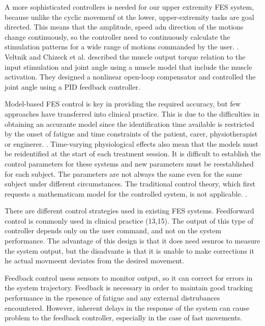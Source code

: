 
A more sophisticated controllers is needed for our upper extremity FES system, because unlike the cyclic movemenf ot the lower, upper-extremity tasks are goal directed. This means that the amplitude, speed adn direction of the motions change continuously, so the controller need to continuously calculate the stimulation patterns for a wide range of motions commanded by the user. \cite{CFF}. 
Veltnik and Chizeck et al. described the muscle output torque relation to the input stimulation and joint angle using a muscle model that include the muscle activation. They designed a nonlinear open-loop compensator and controlled the joint angle using a PID feedback controller. \cite{NNPID}

% 
Model-based FES control is key in providing the required accuracy, but few approaches have transferred into clinical practice. This is due to the difficulties in obtaining an accurante model since the identification time available is restricted by the onset of fatigue and time constraints of the patient, carer, physiotherapist or enginerer. \cite{IOL}.
Time-varying physiological effects also mean that the models must be reidentified at the start of each treatment session. 
It is difficult to establish the control parameters for these systems and new parameters must be reestablished for each subject. The parameters are not always the same even for the same subject under different circumstances. The traditional control theory, which first requests a mathematicam model for the controlled system, is not applicable. \cite{NNPID}.

There are different control strategies used in existing FES systems. Feedforward control is commonly used in clinical practice (13,15). The output of this type of controller depends only on the user command, and not on the system performance. The advantage of this design is that it does need sesnros to measure the system output, but the disadvante is that it is unable to make corrections it he actual movmeent deviates from the desired movement. \cite{CFF}

Feedback control usess sensors to monitor output, so it can correct for errors in the system trajectory. Feedback is necessary in order to maintain good tracking performance in the rpesence of fatigue and any external distrubances encountered. However, inherent delays in the response of the system can cause problem to the feedback controller, especially in the case of fast movements. \cite{CFF}


